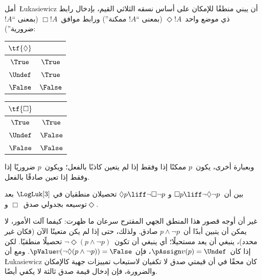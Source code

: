 \documentclass[../../../include/open-logic-section]{subfiles}
\begin{document}
أمل~\L ukasiewicz أن يبني منطقًا للإمكان على أساس نسقه الثلاثي القيم،
بإدخال رابط ذي موضع واحد~$\Diamond !A$ (بمعنى ``$!A$ ممكنة'') ورابط
موافق~$\Box !A$ (بمعنى ``$!A$ ضرورية''):
\begin{center}
  \begin{tabular}{c|c}
    $\tf{\Diamond}$ & \\
    \hline
    $\True$ & $\True$ \\
    $\Undef$ & $\True$ \\
    $\False$ & $\False$
  \end{tabular}
  \quad
  \begin{tabular}{c|c}
    $\tf{\Box}$ & \\
    \hline
    $\True$ & $\True$ \\
    $\Undef$ & $\False$ \\
    $\False$ & $\False$
  \end{tabular}
\end{center}
وبعبارة أخرى، يكون~$p$ ممكنًا إذا وفقط إذا لم يتعين كاذبًا بالفعل؛
ويكون~$p$ ضروريًا إذا وفقط إذا تعين صادقًا بالفعل.

\begin{prob}
  بين أن~$\Box p \liff \lnot\Diamond \lnot p$ و
  $\Diamond p \liff \lnot \Box \lnot p$ تحصيلان منطقيان في
  $\LogLuk[3]$ بعد توسيعه بجدولي صدق~$\Box$ و$\Diamond$.
\end{prob}

غير أن أوجه قصور هذا المنطق الجهي المقترح سرعان ما ظهرت: كيفما آلت
الأمور، لا يمكن أن يتبين أبدًا أن~$p \land \lnot p$ صادق. ولذلك، حتى
إذا لم يكن متعينًا الآن (فكان غير محدد)، ينبغي أن يعد مستحيلًا؛ أي
ينبغي أن تكون~$\lnot \Diamond(p \land \lnot p)$ تحصيلًا منطقيًا.
لكن إذا كان~$\pAssign v(p) = \Undef$، فإن
$\pValue v(\lnot \Diamond(p \land \lnot p)) = \False$. ومع أن
\L ukasiewicz كان محقًا في أن قيمتي صدق لا تكفيان لاستيعاب تمييزات
جهية كالإمكان والضرورة، فإن إدخال قيمة صدق ثالثة لا يكفي أيضًا.
\end{document}

